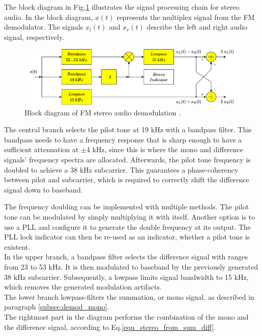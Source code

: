 The block diagram in Fig.\ref{fig_bd_stereo_demod} illustrates the signal processing chain for stereo audio.
In the block diagram, $x(t)$ represents the multiplex signal from the FM demodulator.
The signals $x_l(t)$ and $x_r(t)$ describe the left and right audio signal, respectively.\\

\begin{figure}[!h]
  \centering
    \includegraphics[width=1.0\textwidth]{img/draw.io/bd_fm_demod_stereo_audio}
  \caption{Block diagram of FM stereo audio demodulation \cite{RoppelBegleitmaterial}.}
  \label{fig_bd_stereo_demod}
\end{figure}

The central branch selects the pilot tone at 19 kHz with a bandpass filter.
This bandpass needs to have a frequency response that is sharp enough to have a sufficient attenuation at $\pm$4 kHz, since this is where the mono and difference signals' frequency spectra are allocated.
Afterwards, the pilot tone frequency is doubled to achieve a 38 kHz subcarrier.
This guarantees a phase-coherency between pilot and subcarrier, which is required to correctly shift the difference signal down to baseband.

The frequency doubling can be implemented with multiple methods.
The pilot tone can be modulated by simply multiplying it with itself.
Another option is to use a PLL and configure it to generate the double frequency at its output.
The PLL lock indicator can then be re-used as an indicator, whether a pilot tone is existent.\\

In the upper branch, a bandpass filter selects the difference signal with ranges from 23 to 53 kHz.
It is then modulated to baseband by the previously generated 38 kHz subcarrier.
Subsequently, a lowpass limits signal bandwidth to 15 kHz, which removes the generated modulation artifacts.\\

The lower branch lowpass-filters the summation, or mono signal, as described in paragraph \ref{subsec:demod_mono}.\\

The rightmost part in the diagram performs the combination of the mono and the difference signal, according to Eq.\eqref{equ_stereo_from_sum_diff}.
